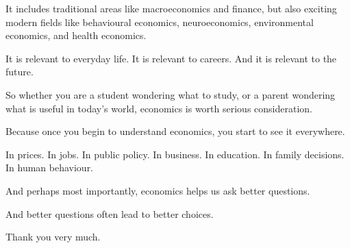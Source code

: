 \documentclass[12pt]{article}
\begin{document}
It includes traditional areas like macroeconomics and finance, but also exciting modern fields like behavioural economics, neuroeconomics, environmental economics, and health economics.

It is relevant to everyday life.  
It is relevant to careers.  
And it is relevant to the future.

So whether you are a student wondering what to study, or a parent wondering what is useful in today’s world, economics is worth serious consideration.

Because once you begin to understand economics, you start to see it everywhere.

In prices.  
In jobs.  
In public policy.  
In business.  
In education.  
In family decisions.  
In human behaviour.

And perhaps most importantly, economics helps us ask better questions.

And better questions often lead to better choices.

Thank you very much.
\end{document}
